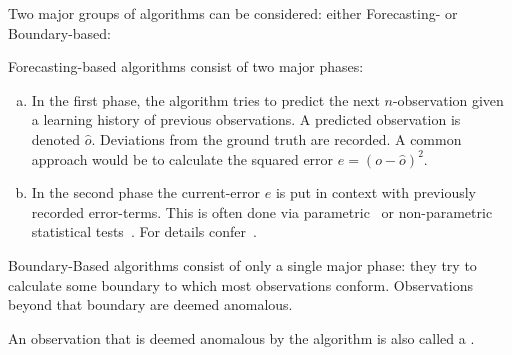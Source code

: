 Two major groups of algorithms can be considered: either Forecasting- or
Boundary-based:
\begin{definition}\label{def:forecasting-based-algo}
    Forecasting-based algorithms consist of two major phases:
    \begin{enumerate}[a.)]
        \item In the first phase, the algorithm tries to predict the next \(n\)-observation
        given a learning history of previous observations. A predicted observation
        is denoted \(\hat{o}\). Deviations from the ground truth are recorded.
        A common approach would be to calculate the squared error \(e = {\left(o - \hat{o}\right)}^2\).
        \item In the second phase the current-error \(e\) is put in context with
        previously recorded error-terms. This is often done via 
        parametric~\cite{Malhotra.2015,Ahmad.2017,Guo.2016,Malhotra.2016,Shipmon.2017,Chauhan.2015} or 
        non-parametric statistical tests~\cite{Zhu.2017,Hundman.2018,Maimo.2018,Su.2019}.
        For details confer~\cite{Zietlow.2020}.
    \end{enumerate}
\end{definition}

\begin{definition}\label{def:boundary-based-algo}
    Boundary-Based algorithms consist of only a single major phase:
    they try to calculate some boundary to which most observations conform.
    Observations beyond that boundary are deemed anomalous.
\end{definition}

\begin{definition}[Detection]\label{def:detection}
    An observation that is deemed anomalous by the algorithm is also called a
    .
\end{definition}
